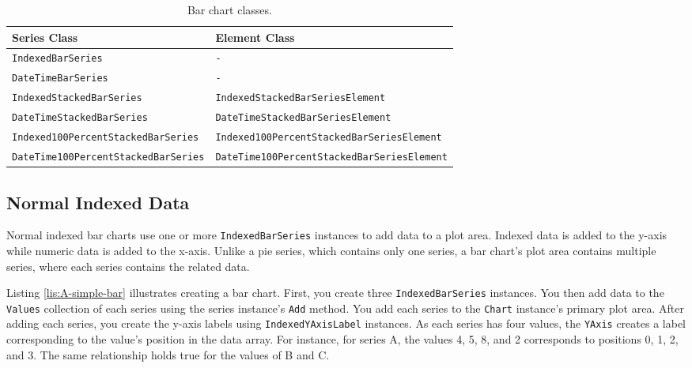 \documentclass[american]{tufte-book}
\providecommand{\tabularnewline}{\\}
\numberwithin{equation}{section}
\numberwithin{figure}{section}
\begin{document}
{\begin{table}
\raggedright
\begin{tabular}{p{}p{}}
\toprule 
{\scriptsize Series Class} & {\scriptsize Element Class}\tabularnewline
\midrule
{\scriptsize\texttt{IndexedBarSeries}} & {\scriptsize\texttt{-}}\tabularnewline
{\scriptsize\texttt{DateTimeBarSeries}} & {\scriptsize\texttt{-}}\tabularnewline
{\scriptsize\texttt{IndexedStackedBarSeries}} & {\scriptsize\texttt{IndexedStackedBarSeriesElement}}\tabularnewline
{\scriptsize\texttt{DateTimeStackedBarSeries}} & {\scriptsize\texttt{DateTimeStackedBarSeriesElement}}\tabularnewline
{\scriptsize\texttt{Indexed100PercentStacked\-BarSeries}} & {\scriptsize\texttt{Indexed100PercentStacked\-BarSeriesElement}}\tabularnewline
{\scriptsize\texttt{DateTime100PercentStacked\-BarSeries}} & {\scriptsize\texttt{DateTime100PercentStacked\-BarSeriesElement}}\tabularnewline
\bottomrule
\end{tabular}\caption{Bar chart classes.}\label{tab:bar-chart-Core-Suite-classes-1}
\end{table}


\subsection{Normal Indexed Data}

Normal indexed bar charts use one or more \texttt{IndexedBarSeries}
instances to add data to a plot area. Indexed data is added to the
y-axis while numeric data is added to the x-axis. Unlike a pie series,
which contains only one series, a bar chart's plot area contains multiple
series, where each series contains the related data. 

Listing \ref{lis:A-simple-bar} illustrates creating a bar chart.
First, you create three \texttt{IndexedBarSeries} instances. You then
add data to the \texttt{Values} collection of each series using the
series instance's \texttt{Add} method. You add each series to the \texttt{Chart}
instance's primary plot area. After adding each series, you create
the y-axis labels using \texttt{IndexedYAxisLabel} instances. As each
series has four values, the \texttt{YAxis} creates a label corresponding
to the value's position in the data array. For instance, for series
A, the values 4, 5, 8, and 2 corresponds to positions 0, 1, 2, and
3. The same relationship holds true for the values of B and C.

}
\end{document}
